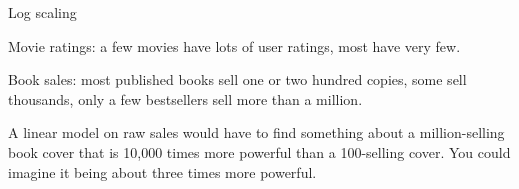 \begin{frame}[fragile]{Log scaling}
  \begin{withmargin}
    \begin{tdmargin}
      Movie ratings: a few movies have lots of user ratings, most have very few.
      \par\medskip
      Book sales: most published books sell one or two hundred copies, some sell
      thousands, only a few bestsellers sell more than a million.
      \par\medskip
      A linear model on raw sales would have to find something about a
      million-selling book cover that is 10{,}000 times more powerful than a
      100-selling cover. You could imagine it being about three times more
      powerful.
    \end{tdmargin}
  \end{withmargin}
\end{frame}

